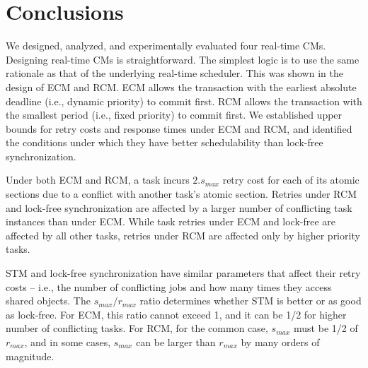 \documentclass[a4paper,english]{article}
\begin{document}


\section{Conclusions}
\label{sec:conclusions}

We designed, analyzed, and experimentally evaluated four real-time CMs. Designing real-time CMs is straightforward. The simplest logic is to use the same rationale as that of the underlying real-time scheduler. This was shown in the design of ECM and RCM. ECM allows the transaction with the earliest absolute deadline (i.e., dynamic priority) to commit first. RCM allows the transaction with the smallest period (i.e., fixed priority) to commit first. We established upper bounds for retry costs and response times under ECM and RCM, and identified the conditions under which they have better schedulability than lock-free synchronization. 

Under both ECM and RCM, a task incurs $2.s_{max}$ retry cost for each of its atomic sections due to a conflict with another task's atomic section. Retries under RCM and lock-free synchronization are affected by a larger number of conflicting task instances than under ECM. While task retries under ECM and lock-free are affected by all other tasks, retries under RCM are affected only by higher priority tasks. 

STM and lock-free synchronization have similar parameters that affect their retry costs -- i.e., the number of conflicting jobs and how many times they access shared objects. The $s_{max}/r_{max}$ ratio determines whether STM is better or as good as lock-free. For ECM, this ratio cannot exceed 1, and it can be 1/2 for higher number of conflicting tasks. For RCM, for the common case, $s_{max}$ must be 1/2 of $r_{max}$, and in some cases, $s_{max}$ can be larger than $r_{max}$ by many orders of magnitude.
\end{document}
